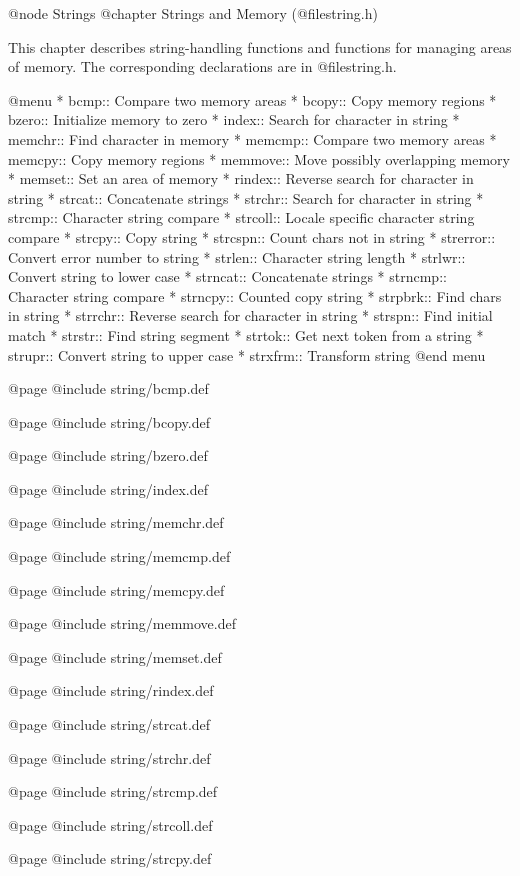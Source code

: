 @node Strings
@chapter Strings and Memory (@file{string.h})

This chapter describes string-handling functions and functions for
managing areas of memory.  The corresponding declarations are in
@file{string.h}.

@menu
* bcmp::        Compare two memory areas
* bcopy::       Copy memory regions
* bzero::       Initialize memory to zero
* index::       Search for character in string
* memchr::      Find character in memory
* memcmp::      Compare two memory areas
* memcpy::      Copy memory regions
* memmove::     Move possibly overlapping memory
* memset::      Set an area of memory
* rindex::      Reverse search for character in string
* strcat::      Concatenate strings
* strchr::      Search for character in string
* strcmp::      Character string compare
* strcoll::     Locale specific character string compare
* strcpy::      Copy string
* strcspn::     Count chars not in string
* strerror::    Convert error number to string
* strlen::      Character string length
* strlwr::	Convert string to lower case
* strncat::     Concatenate strings
* strncmp::     Character string compare
* strncpy::     Counted copy string
* strpbrk::     Find chars in string
* strrchr::     Reverse search for character in string
* strspn::      Find initial match
* strstr::      Find string segment
* strtok::      Get next token from a string
* strupr::	Convert string to upper case
* strxfrm::     Transform string
@end menu

@page
@include string/bcmp.def

@page
@include string/bcopy.def

@page
@include string/bzero.def

@page
@include string/index.def

@page
@include string/memchr.def

@page
@include string/memcmp.def

@page
@include string/memcpy.def

@page
@include string/memmove.def

@page
@include string/memset.def

@page
@include string/rindex.def

@page
@include string/strcat.def

@page
@include string/strchr.def

@page
@include string/strcmp.def

@page
@include string/strcoll.def

@page
@include string/strcpy.def

